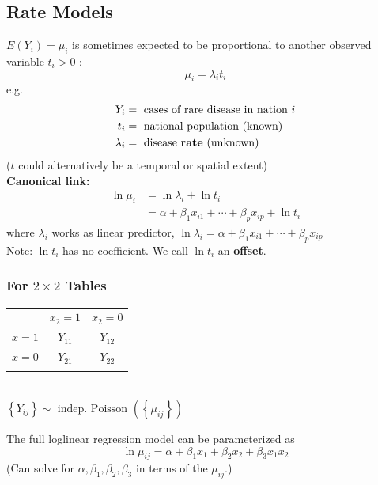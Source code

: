 \documentclass[11pt]{elegantbook}
\begin{document}
\subsection{Rate Models}
$E\left(Y_i\right)=\mu_i$ is sometimes expected to be proportional to another observed variable $t_i>0$ :
$$
\mu_i=\lambda_i t_i
$$
e.g.
$$
\begin{aligned}
Y_i & =\text { cases of rare disease in nation } i \\
t_i & =\text { national population (known) } \\
\lambda_i & =\text { disease \textbf{rate} (unknown) }
\end{aligned}
$$
($t$ could alternatively be a temporal or spatial extent)\\
\textbf{Canonical link:}
$$
\begin{aligned}
\ln \mu_i & =\ln \lambda_i+\ln t_i \\
& =\alpha+\beta_1 x_{i 1}+\cdots+\beta_p x_{i p}+\ln t_i
\end{aligned}
$$
where $\lambda_i$ works as linear predictor, $\ln \lambda_i=\alpha+\beta_1 x_{i 1}+\cdots+\beta_p x_{i p}$\\
Note: $\ln t_i$ has no coefficient. We call $\ln t_i$ an \textbf{offset}.


\subsubsection*{For $2\times 2$ Tables}
\begin{table}[htbp]
    \centering
    \begin{tabular}{rcccc}
        \multicolumn{1}{r}{}&\multicolumn{2}{c}{$x_2=1$}&\multicolumn{2}{c}{$x_2=0$}\\
        \cline{2-5}
        \multicolumn{1}{r|}{$x=1$}&\multicolumn{2}{c|}{$Y_{11}$}&\multicolumn{2}{c|}{$Y_{12}$}\\
        \cline{2-5}
        \multicolumn{1}{r|}{$x=0$}&\multicolumn{2}{c|}{$Y_{21}$}&\multicolumn{2}{c|}{$Y_{22}$}\\
        \cline{2-5}
        \multicolumn{1}{c}{}&&&&
    \end{tabular}\\
    $\left\{Y_{i j}\right\} \sim \text { indep. Poisson }\left(\left\{\mu_{i j}\right\}\right)$
\end{table}
The full loglinear regression model can be parameterized as
$$
\ln \mu_{i j}=\alpha+\beta_1 x_1+\beta_2 x_2+\beta_3 x_1 x_2
$$
(Can solve for $\alpha, \beta_1, \beta_2, \beta_3$ in terms of the $\mu_{i j}$.)
\end{document}
